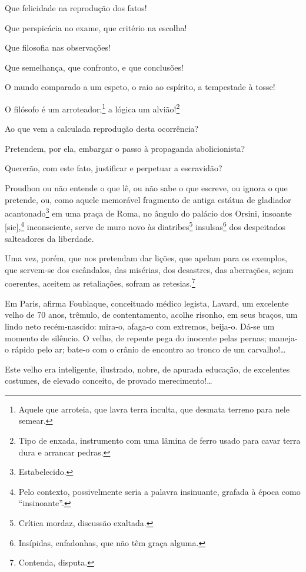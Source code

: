 \asterisc

Que felicidade na reprodução dos fatos!

Que perspicácia no exame, que critério na escolha!

Que filosofia nas observações!

Que semelhança, que confronto, e que conclusões!

O mundo comparado a um espeto, o raio ao espírito, a tempestade à tosse!

O filósofo é um arroteador;\footnote{Aquele que arroteia, que lavra
  terra inculta, que desmata terreno para nele semear.} a lógica um
alvião!\footnote{Tipo de enxada, instrumento com uma lâmina de ferro
  usado para cavar terra dura e arrancar pedras.}

Ao que vem a calculada reprodução desta ocorrência?

Pretendem, por ela, embargar o passo à propaganda abolicionista?

Quererão, com este fato, justificar e perpetuar a escravidão?

Proudhon ou não entende o que lê, ou não sabe o que escreve, ou
ignora o que pretende, ou, como aquele memorável fragmento de antiga
estátua de gladiador acantonado\footnote{Estabelecido.} em uma praça
de Roma, no ângulo do palácio dos Orsini, insoante {[}sic{]},\footnote{
  Pelo contexto, possivelmente seria a palavra insinuante, grafada à
  época como ``insinoante''.} inconsciente, serve de muro novo às
diatribes\footnote{Crítica mordaz, discussão exaltada.}
insulsas\footnote{Insípidas, enfadonhas, que não têm graça alguma.}
dos despeitados salteadores da liberdade.

Uma vez, porém, que nos pretendam dar lições, que apelam para os
exemplos, que servem-se dos escândalos, das misérias, dos desastres, das
aberrações, sejam coerentes, aceitem as retaliações, sofram as
retesias.\footnote{Contenda, disputa.}

\asterisc

Em Paris, afirma Foublaque, conceituado médico legista, Lavard, um
excelente velho de 70 anos, trêmulo, de contentamento, acolhe risonho,
em seus braços, um lindo neto recém-nascido: mira-o, afaga-o com
extremos, beija-o. Dá-se um momento de silêncio. O velho, de repente
pega do inocente pelas pernas; maneja-o rápido pelo ar; bate-o com o
crânio de encontro ao tronco de um carvalho!\ldots{}

Este velho era inteligente, ilustrado, nobre, de apurada educação, de
excelentes costumes, de elevado conceito, de provado merecimento!\ldots{}

